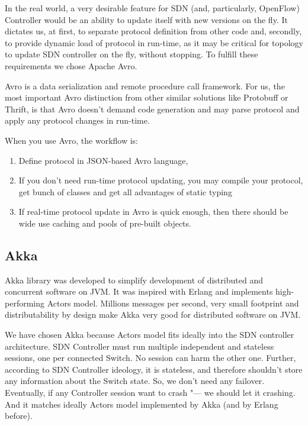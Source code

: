 \documentclass[10pt, a5paper]{article}
\begin{document}
In the real world, a very desirable feature for SDN (and, particularly, OpenFlow) Controller would be an ability to update itself with new versions on the fly. It dictates us, at first, to separate  protocol definition from other code and, secondly, to provide dynamic load of protocol in run-time, as it may be critical for topology to update SDN controller on the fly, without stopping. To fulfill these requirements we chose Apache Avro.

Avro is a data serialization and remote procedure call framework. For us, the most important Avro distinction from other similar solutions like Protobuff or Thrift, is that Avro doesn't demand code generation and may parse protocol and apply any protocol changes in run-time.

When you use Avro, the workflow is:

\begin{enumerate}
  \item Define protocol in JSON-based Avro language,
  \item If you don't need run-time protocol updating, you may compile your protocol, get bunch of classes and get all advantages of static typing
  \item If real-time protocol update in Avro is quick enough, then there should be wide use caching and pools of pre-built objects.
\end{enumerate}

\subsection*{Akka}

Akka library was developed to simplify development of distributed and concurrent software on JVM. It was inspired with Erlang and implements high-performing Actors model. Millions messages per se\-cond, very small footprint and distributability by design make Akka very good for distributed software on JVM.

We have chosen Akka because Actors model fits ideally into the SDN controller architecture. SDN Controller must run multiple independent and stateless sessions, one per connected Switch. No session can harm the other one. Further, according to SDN Controller ideology, it is stateless, and therefore shouldn't store any information about the Switch state. So, we don't need any failover. Eventually, if any Controller session want to crash "--- we should let it crashing. And it matches ideally Actors model implemented by Akka (and by Erlang before).
\end{document}
